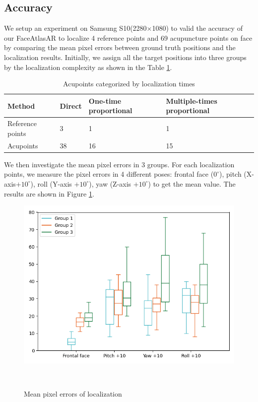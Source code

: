 \subsection{Accuracy}
\label{sec:res-accuracy}
We setup an experiment on Samsung S10(2280$\times$1080) to valid the accuracy of our FaceAtlasAR to localize 4 reference points and 69 acupuncture points on face by comparing the mean pixel errors between ground truth positions and the localization results. Initially, we assign all the target positions into three groups by the localization complexity as shown in the Table \ref{tab:acupoint-cat}.
\begin{table}
\caption{Acupoints categorized by localization times}
\begin{center}
\begin{tabular}{p{}|p{}|p{}|p{}}
\hline
Method & Direct & One-time proportional& Multiple-times proportional\\
\hline
Reference points &3& 1  & 1\\
\hline
Acupoints & 38 & 16 &15 \\
\hline
\end{tabular}
\end{center}
\label{tab:acupoint-cat}
\end{table}

We then investigate the mean pixel errors in 3 groups. For each localization points, we measure the pixel errors in 4 different poses: frontal face ($0^{\circ}$), pitch (X-axis$+10^{\circ}$), roll (Y-axis $+10^{\circ}$), yaw (Z-axis $+10^{\circ}$) to get the mean value. The results are shown in Figure \ref{fig:mean-pixel-err}.
\begin{figure}
  \centering
    \includegraphics[width=\columnwidth]{figures/mean_pixel_err.png}
    \caption{Mean pixel errors of localization}~\label{fig:mean-pixel-err}
  \end{figure}

